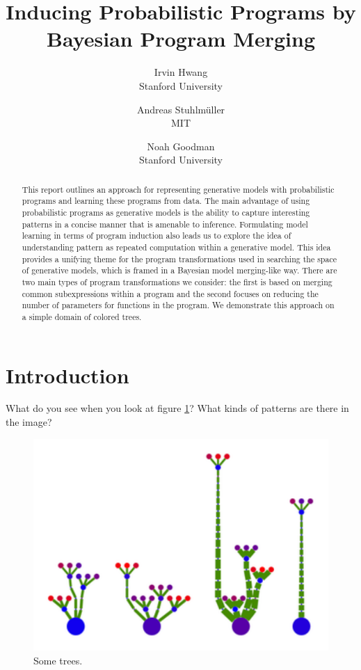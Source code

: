 \documentclass[a4paper,10pt]{article}
\begin{document}
\title{Inducing Probabilistic Programs by Bayesian Program Merging}
\author{Irvin Hwang\\Stanford University  \and Andreas Stuhlm\"{u}ller\\MIT \and Noah Goodman\\Stanford University}
\date{}
\maketitle
\begin{abstract}
This report outlines an approach for representing generative models with probabilistic programs and learning these programs from data.  The main advantage of using probabilistic programs as generative models is the ability to capture interesting patterns in a concise manner that is amenable to inference.  Formulating model learning in terms of program induction also leads us to explore the idea of understanding pattern as repeated computation within a generative model.  This idea provides a unifying theme for the program transformations used in searching the space of generative models, which is framed in a Bayesian model merging-like way.  There are two main types of program transformations we consider: the first is based on merging common subexpressions within a program and the second focuses on reducing the number of parameters for functions in the program.  We demonstrate this approach on a simple domain of colored trees.
\end{abstract}
\section{Introduction}
What do you see when you look at figure \ref{fig:plants}? What kinds of patterns are there in the image? 
\begin{figure}[h]
\begin{center}
\includegraphics[scale=.60]{trees.pdf}
\end{center}
\caption{Some trees.}
\label{fig:plants}
\end{figure}
\end{document}

